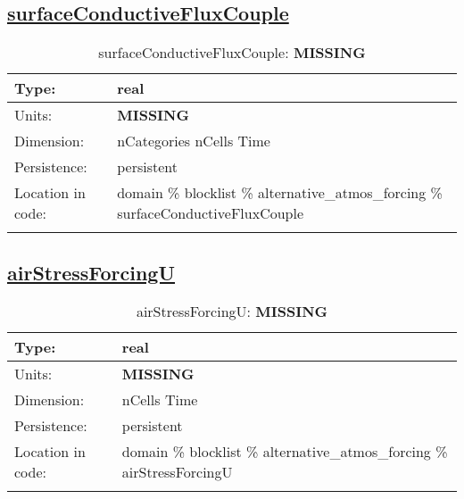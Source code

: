 \subsection[surfaceConductiveFluxCouple]{\hyperref[sec:var_tab_alternative_atmos_forcing]{surfaceConductiveFluxCouple}}
\label{subsec:var_sec_alternative_atmos_forcing_surfaceConductiveFluxCouple}
\begin{center}
\begin{longtable}{| p{2.0in} | p{4.0in} |}
        \hline 
        Type: & real \\
        \hline 
        Units: & {\bf \color{red} MISSING} \\
        \hline 
        Dimension: & nCategories nCells Time \\
        \hline 
        Persistence: & persistent \\
        \hline 
         Location in code: & domain \% blocklist \% alternative\_atmos\_forcing \% surfaceConductiveFluxCouple \\
         \hline 
    \caption{surfaceConductiveFluxCouple: {\bf \color{red} MISSING}}
\end{longtable}
\end{center}
\subsection[airStressForcingU]{\hyperref[sec:var_tab_alternative_atmos_forcing]{airStressForcingU}}
\label{subsec:var_sec_alternative_atmos_forcing_airStressForcingU}
\begin{center}
\begin{longtable}{| p{2.0in} | p{4.0in} |}
        \hline 
        Type: & real \\
        \hline 
        Units: & {\bf \color{red} MISSING} \\
        \hline 
        Dimension: & nCells Time \\
        \hline 
        Persistence: & persistent \\
        \hline 
         Location in code: & domain \% blocklist \% alternative\_atmos\_forcing \% airStressForcingU \\
         \hline 
    \caption{airStressForcingU: {\bf \color{red} MISSING}}
\end{longtable}
\end{center}
